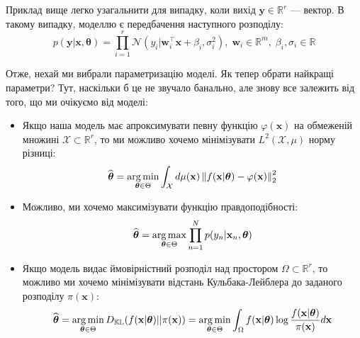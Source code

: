 \begin{remark}
	Приклад вище легко узагальнити для випадку, коли вихід $\mathbf{y} \in \mathbb{R}^r$ --- вектор. В такому випадку, 
	моделлю є передбачення наступного розподілу:
	\begin{equation}
		p(\mathbf{y}|\mathbf{x},\boldsymbol{\theta}) = \prod_{i=1}^r \mathcal{N}(y_i|\boldsymbol{w}_i^{\top}\mathbf{x} + \beta_i, \sigma_i^2), \; \boldsymbol{w}_i \in \mathbb{R}^m, \; \beta_i,\sigma_i \in \mathbb{R}
	\end{equation}
\end{remark}

Отже, нехай ми вибрали параметризацію моделі. Як тепер обрати найкращі параметри?
Тут, наскільки б це не звучало банально, але знову все залежить від того, що ми
очікуємо від моделі:
\begin{itemize}
	\item Якщо наша модель має апроксимувати певну функцію $\varphi(\mathbf{x})$ на 
	обмеженій множині $\mathcal{X} \subset \mathbb{R}^r$, то ми можливо хочемо 
	мінімізувати $L^2(\mathcal{X},\mu)$ норму різниці:
	\begin{equation*}
		\widehat{\boldsymbol{\theta}} = \operatorname*{arg\,min}_{\boldsymbol{\theta} \in \Theta} \int_{\mathcal{X}} d\mu(\mathbf{x}) \left\| f(\mathbf{x}|\boldsymbol{\theta}) - \varphi(\mathbf{x}) \right\|_2^2
	\end{equation*}
	\item Можливо, ми хочемо максимізувати функцію правдоподібності:
	\begin{equation*}
		\widehat{\boldsymbol{\theta}} = \operatorname*{arg\,max}_{\boldsymbol{\theta} \in \Theta} \prod_{n=1}^N p(y_n|\mathbf{x}_n,\boldsymbol{\theta})
	\end{equation*}
	\item Якщо модель видає ймовірністний розподіл над простором $\Omega \subset \mathbb{R}^r$, то можливо ми хочемо мінімізувати відстань Кульбака-Лейблера до заданого розподілу $\pi(\mathbf{x})$:
	\begin{equation*}
		\widehat{\boldsymbol{\theta}} = \operatorname*{arg\,min}_{\boldsymbol{\theta} \in \Theta} D_{\mathbb{KL}}(f(\mathbf{x}|\boldsymbol{\theta})||\pi(\mathbf{x})) = \operatorname*{arg\,min}_{\boldsymbol{\theta} \in \Theta} \int_{\Omega} f(\mathbf{x} | \boldsymbol{\theta}) \log \frac{f(\mathbf{x} | \boldsymbol{\theta})}{\pi(\mathbf{x})}d\mathbf{x}
	\end{equation*}
\end{itemize}

